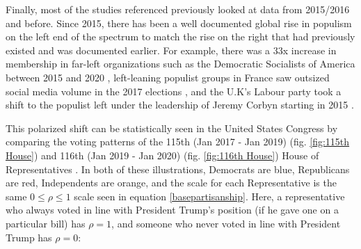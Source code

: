 \documentclass[preprint,review,12pt]{elsarticle}
\begin{document}
Finally, most of the studies referenced previously looked at data from 2015/2016 and before. Since 2015, there has been a well documented global rise in populism on the left end of the spectrum to match the rise on the right that had previously existed and was documented earlier. For example, there was a 33x increase in membership in far-left organizations such as the Democratic Socialists of America between 2015 and 2020 \cite{godfrey2020thousands}, left-leaning populist groups in France saw outsized social media volume in the 2017 elections \cite{donadio2017french}, and the U.K's Labour party took a shift to the populist left under the leadership of Jeremy Corbyn starting in 2015 \cite{wainwright2018remarkable,hobson_fielding_2019}. 

This polarized shift can be statistically seen in the United States Congress by comparing the voting patterns of the 115th (Jan 2017 - Jan 2019) (fig. \ref{fig:115th House}) and 116th (Jan 2019 - Jan 2020) (fig. \ref{fig:116th House}) House of Representatives \cite{fivethirtyeight2018tracking}. In both of these illustrations, Democrats are blue, Republicans are red, Independents are orange, and the scale for each Representative is the same $0\leq \rho \leq 1$ scale seen in equation \ref{basepartisanship}. Here, a representative who always voted in line with President Trump's position (if he gave one on a particular bill) has $\rho = 1$, and someone who never voted in line with President Trump has $\rho = 0$:
\end{document}
